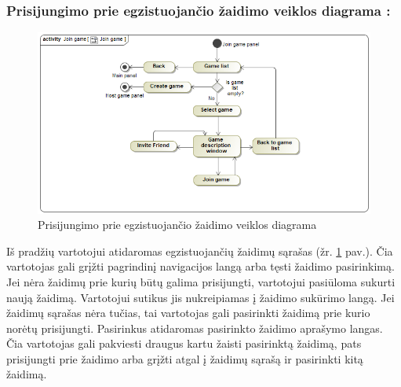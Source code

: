 \documentclass{VUMIFPSkursinis}
\begin{document}
		\subsubsection*{Prisijungimo prie egzistuojančio žaidimo veiklos diagrama :}
			\begin{figure}[H]
				\centering
				\includegraphics[scale=0.5]{img/JoinGame_activity}
				\caption{Prisijungimo prie egzistuojančio žaidimo veiklos diagrama}
				\label{img:JoinGame_activity}
			\end{figure}
			Iš pradžių vartotojui atidaromas egzistuojančių žaidimų sąrašas (žr. \ref{img:JoinGame_activity} pav.). Čia 
			vartotojas gali grįžti pagrindinį navigacijos langą arba tęsti žaidimo
			pasirinkimą. Jei nėra žaidimų prie kurių būtų galima prisijungti, vartotojui
			pasiūloma sukurti naują žaidimą. Vartotojui sutikus jis nukreipiamas į 
			žaidimo sukūrimo langą. Jei žaidimų sąrašas nėra tučias, tai vartotojas
			gali pasirinkti žaidimą prie kurio norėtų prisijungti. Pasirinkus atidaromas
			pasirinkto žaidimo aprašymo langas. Čia vartotojas gali pakviesti draugus
			kartu žaisti pasirinktą žaidimą, pats prisijungti prie žaidimo arba grįžti
			atgal į žaidimų sąrašą ir pasirinkti kitą žaidimą.
\end{document}
